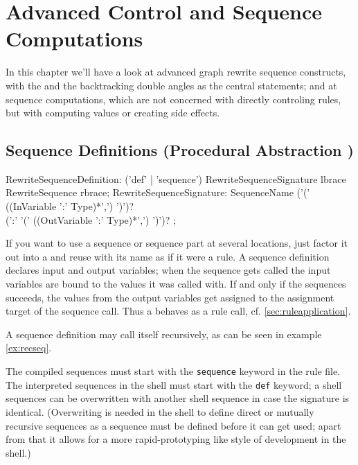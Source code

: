 \chapter{Advanced Control and Sequence Computations}
\label{cha:transaction}

In this chapter we'll have a look at advanced graph rewrite sequence constructs,
with the  and the backtracking double angles as the central statements;
and at sequence computations, which are not concerned with directly controling rules,
but with computing values or creating side effects.


\section{Sequence Definitions (Procedural Abstraction )} \label{sec:sequencedefinition}
\begin{rail}
  RewriteSequenceDefinition: 
    ('def' | 'sequence') RewriteSequenceSignature lbrace RewriteSequence rbrace;
  RewriteSequenceSignature: 
    SequenceName ('(' ((InVariable ':' Type)*',') ')')? \\ (':' '(' ((OutVariable ':' Type)*',') ')')?
	;
\end{rail}

If you want to use a sequence or sequence part at several locations, just factor it out into a  and reuse with its name as if it were a rule.
A sequence definition declares input and output variables; 
when the sequence gets called the input variables are bound to the values it was called with.
If and only if the sequences succeeds, the values from the output variables get assigned to the assignment target of the sequence call.
Thus a  behaves as a rule call, cf. \ref{sec:ruleapplication}.

A sequence definition may call itself recursively, as can be seen in example \ref{ex:recseq}.

The compiled sequences must start with the \texttt{sequence} keyword in the rule file.
The interpreted sequences in the shell must start with the \texttt{def} keyword; a shell sequences can be overwritten with another shell sequence in case the signature is identical. (Overwriting is needed in the shell to define direct or mutually recursive sequences as a sequence must be defined before it can get used; apart from that it allows for a more rapid-prototyping like style of development in the shell.)

